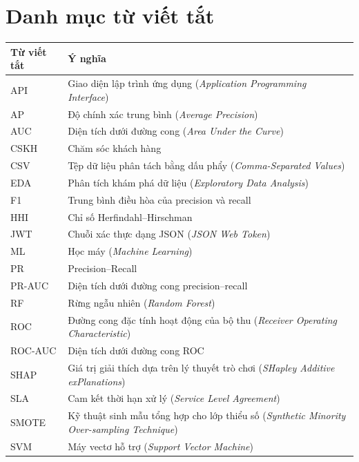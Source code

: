 \documentclass[12pt,a4paper]{report}
\begin{document}
\tableofcontents
\listoffigures{}
\listoftables{}
\chapter*{Danh mục từ viết tắt}

\begin{longtable}{@{}p{3.2cm}p{11.5cm}@{}}
\toprule
\textbf{Từ viết tắt} & \textbf{Ý nghĩa} \\
\midrule
\endhead
\bottomrule
\endfoot
API     & Giao diện lập trình ứng dụng (\emph{Application Programming Interface}) \\
AP      & Độ chính xác trung bình (\emph{Average Precision}) \\
AUC     & Diện tích dưới đường cong (\emph{Area Under the Curve}) \\
CSKH    & Chăm sóc khách hàng \\
CSV     & Tệp dữ liệu phân tách bằng dấu phẩy (\emph{Comma-Separated Values}) \\
EDA     & Phân tích khám phá dữ liệu (\emph{Exploratory Data Analysis}) \\
F1      & Trung bình điều hòa của precision và recall \\
HHI     & Chỉ số Herfindahl--Hirschman \\
JWT     & Chuỗi xác thực dạng JSON (\emph{JSON Web Token}) \\
ML      & Học máy (\emph{Machine Learning}) \\
PR      & Precision--Recall \\
PR-AUC  & Diện tích dưới đường cong precision--recall \\
RF      & Rừng ngẫu nhiên (\emph{Random Forest}) \\
ROC     & Đường cong đặc tính hoạt động của bộ thu (\emph{Receiver Operating Characteristic}) \\
ROC-AUC & Diện tích dưới đường cong ROC \\
SHAP    & Giá trị giải thích dựa trên lý thuyết trò chơi (\emph{SHapley Additive exPlanations}) \\
SLA     & Cam kết thời hạn xử lý (\emph{Service Level Agreement}) \\
SMOTE   & Kỹ thuật sinh mẫu tổng hợp cho lớp thiểu số (\emph{Synthetic Minority Over-sampling Technique}) \\
SVM     & Máy vectơ hỗ trợ (\emph{Support Vector Machine}) \\
\end{longtable}
\end{document}

